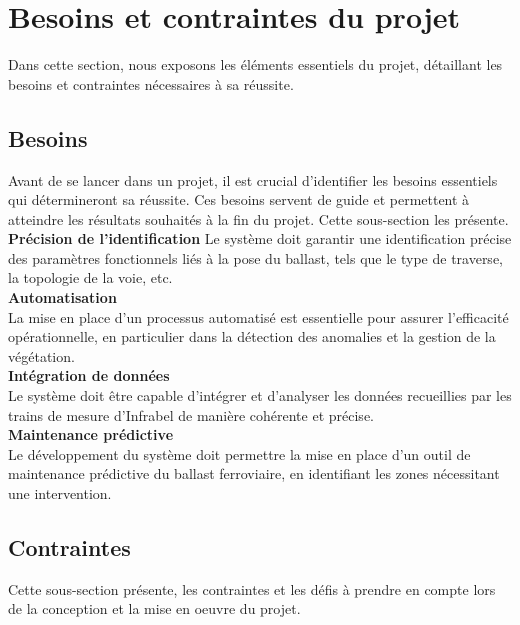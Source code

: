\section{Besoins et contraintes du projet}

Dans cette section, nous exposons les éléments essentiels du projet, détaillant les besoins et contraintes nécessaires à sa réussite.


\subsection{Besoins}
Avant de se lancer dans un projet, il est crucial d'identifier les besoins essentiels qui détermineront sa réussite. Ces besoins servent de guide et permettent à atteindre les résultats souhaités à la fin du projet. Cette sous-section les présente. \\

\noindent \textbf{Précision de l'identification} Le système doit garantir une identification précise des paramètres fonctionnels liés à la pose du ballast, tels que le type de traverse, la topologie de la voie, etc. \\

\noindent \textbf{Automatisation} \\
 La mise en place d'un processus automatisé est essentielle pour assurer l'efficacité opérationnelle, en particulier dans la détection des anomalies et la gestion de la végétation. \\
 
\noindent \textbf{Intégration de données} \\
Le système doit être capable d'intégrer et d'analyser les données recueillies par les trains de mesure d'Infrabel de manière cohérente et précise. \\

\noindent \textbf{Maintenance prédictive} \\
Le développement du système doit permettre la mise en place d'un outil de maintenance prédictive du ballast ferroviaire, en identifiant les zones nécessitant une intervention.
    


\subsection{Contraintes}
Cette sous-section présente, les contraintes et les défis à prendre en compte lors de la conception et la mise en oeuvre du projet. \\

